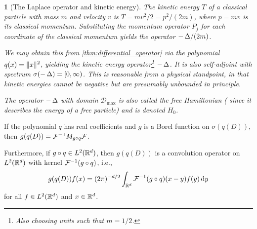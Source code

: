 \documentclass[article, a4paper, 11pt, oneside]{memoir}
\makeatletter
\numberwithin{equation}{chapter}
\newcommand{\dom}{\mathcal{D}}
\theoremstyle{myexample}
\theoremstyle{myexample}
\theoremstyle{myexamplebreak}
\theoremstyle{myexamplebreak}
\newtheorem{examplebreak}[theorem]{\protect\@example}
\theoremstyle{nonumberplain}
\theoremstyle{MyNonumberplain}
\newcommand{\@example}{}
\renewcommand{\@example}{Example}%
\renewcommand{\@example}{Eksempel}%
\makeatother
\begin{document}
\begin{examplebreak}[The Laplace operator and kinetic energy]
    The kinetic energy $T$ of a classical particle with mass $m$ and velocity $v$ is $T = mv^2/2 = p^2/(2m)$, where $p = mv$ is its classical momentum. Substituting the momentum operator $P_j$ for each coordinate of the classical momentum yields the operator $-\mathop{}\!\Delta/(2m)$. 
    
    We may obtain this from \cref{thm:differential_operator} via the polynomial $q(x) = \lVert x\rVert^2$, yielding the kinetic energy operator\footnote{Also choosing units such that $m = 1/2$.} $-\mathop{}\!\Delta$. It is also self-adjoint with spectrum $\sigma(-\mathop{}\!\Delta) = [0,\infty)$. This is reasonable from a physical standpoint, in that kinetic energies cannot be negative but are presumably unbounded in principle.
    
    The operator $-\mathop{}\!\Delta$ with domain $\dom_{\max}$ is also called the \emph{free Hamiltonian} ( since it describes the energy of a free particle) and is denoted $H_0$.
\end{examplebreak}



\begin{proposition}
    \label{thm:differential_operator_kernel}
    If the polynomial $q$ has real coefficients and $g$ is a Borel function on $\sigma(q(D))$, then $g(q(D)) = \mathcal{F}^{-1} M_{g \circ q} \mathcal{F}$.
    
    Furthermore, if $g \circ q \in L^2(\mathbb{R}^d)$, then $g(q(D))$ is a convolution operator on $L^2(\mathbb{R}^d)$ with kernel $\mathcal{F}^{-1}(g \circ q)$, i.e.,
    \begin{equation}
        \label{eq:differential_convolution}
        g(q(D))f(x)
            = (2\pi)^{-d/2} \int_{\mathbb{R}^d} \mathcal{F}^{-1} (g \circ q) (x-y) f(y) \mathop{}\!\mathrm{d} y
    \end{equation}
    for all $f \in L^2(\mathbb{R}^d)$ and $x \in \mathbb{R}^d$.
\end{proposition}
\end{document}
